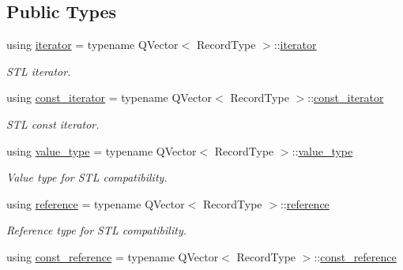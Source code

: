 \subsection*{Public Types}
\begin{DoxyCompactItemize}
\item 
using \hyperlink{class_mdt_1_1_plain_text_1_1_record_list_template_a5b0caae56b05a38e53539cad1da8cd12}{iterator} = typename Q\+Vector$<$ Record\+Type $>$\+::\hyperlink{class_mdt_1_1_plain_text_1_1_record_list_template_a5b0caae56b05a38e53539cad1da8cd12}{iterator}
\begin{DoxyCompactList}\small\item\em S\+TL iterator. \end{DoxyCompactList}\item 
using \hyperlink{class_mdt_1_1_plain_text_1_1_record_list_template_abfba36291fe9cb605ec432ed873ce4ea}{const\+\_\+iterator} = typename Q\+Vector$<$ Record\+Type $>$\+::\hyperlink{class_mdt_1_1_plain_text_1_1_record_list_template_abfba36291fe9cb605ec432ed873ce4ea}{const\+\_\+iterator}
\begin{DoxyCompactList}\small\item\em S\+TL const iterator. \end{DoxyCompactList}\item 
using \hyperlink{class_mdt_1_1_plain_text_1_1_record_list_template_a15ca07bf051f835ce544901a06639990}{value\+\_\+type} = typename Q\+Vector$<$ Record\+Type $>$\+::\hyperlink{class_mdt_1_1_plain_text_1_1_record_list_template_a15ca07bf051f835ce544901a06639990}{value\+\_\+type}
\begin{DoxyCompactList}\small\item\em Value type for S\+TL compatibility. \end{DoxyCompactList}\item 
using \hyperlink{class_mdt_1_1_plain_text_1_1_record_list_template_a9f3af13db580a27488883003f589489f}{reference} = typename Q\+Vector$<$ Record\+Type $>$\+::\hyperlink{class_mdt_1_1_plain_text_1_1_record_list_template_a9f3af13db580a27488883003f589489f}{reference}
\begin{DoxyCompactList}\small\item\em Reference type for S\+TL compatibility. \end{DoxyCompactList}\item 
using \hyperlink{class_mdt_1_1_plain_text_1_1_record_list_template_af264f3a2efda437fd0f58cbb15209b06}{const\+\_\+reference} = typename Q\+Vector$<$ Record\+Type $>$\+::\hyperlink{class_mdt_1_1_plain_text_1_1_record_list_template_af264f3a2efda437fd0f58cbb15209b06}{const\+\_\+reference}

\end{DoxyCompactItemize}
